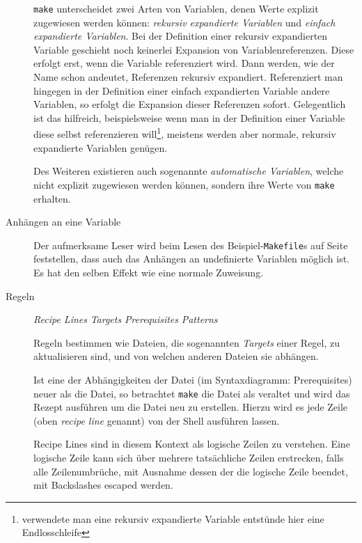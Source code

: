 \begin{description}
		\texttt{make} unterscheidet zwei Arten von Variablen, denen Werte
		explizit zugewiesen werden können: \emph{rekursiv expandierte Variablen}
		und \emph{einfach expandierte Variablen}.
		Bei der Definition einer rekursiv expandierten Variable geschieht noch
		keinerlei Expansion von Variablenreferenzen. Diese erfolgt erst, wenn
		die Variable referenziert wird. Dann werden, wie der Name schon
		andeutet, Referenzen rekursiv expandiert.
		Referenziert man hingegen in der Definition einer einfach expandierten
		Variable andere Variablen, so erfolgt die Expansion dieser Referenzen
		sofort. Gelegentlich ist das hilfreich, beispielsweise wenn man in der
		Definition einer Variable diese selbst referenzieren
		will\footnote{verwendete man eine rekursiv expandierte Variable
		entstünde hier eine Endlosschleife}, meistens werden aber normale,
		rekursiv expandierte Variablen genügen.
		
		Des Weiteren existieren auch sogenannte \emph{automatische Variablen},
		welche nicht explizit zugewiesen werden können, sondern ihre Werte von
		\texttt{make} erhalten.
	\item[Anhängen an eine Variable] \hspace{\fill}
	
		
		Der aufmerksame Leser wird beim Lesen des Beispiel-\texttt{Makefile}s
		auf Seite~\pageref{subsubsection:examplemakefile} feststellen, dass
		auch das Anhängen an undefinierte Variablen möglich ist. Es hat den
		selben Effekt wie eine normale Zuweisung.

	\item[Regeln] \hspace{\fill}
		
		\textit{Recipe Lines} 
		\textit{Targets} 
		\textit{Prerequisites} 
		\textit{Patterns} 

		Regeln bestimmen wie Dateien, die sogenannten \emph{Targets} einer
		Regel, zu aktualisieren sind, und von welchen anderen Dateien sie abhängen.
		
		Ist eine der Abhängigkeiten der Datei (im Syntaxdiagramm: Prerequisites)
		neuer als die Datei, so betrachtet \texttt{make} die Datei als veraltet
		und wird das Rezept ausführen um die Datei neu zu erstellen. Hierzu wird
		es jede Zeile (oben \textit{recipe line} genannt) von der Shell
		ausführen lassen.

		Recipe Lines sind in diesem Kontext als logische Zeilen zu verstehen.
		Eine logische Zeile kann sich über mehrere tatsächliche Zeilen
		erstrecken, falls alle Zeilenumbrüche, mit Ausnahme dessen der die
		logische Zeile beendet, mit Backslashes escaped werden.
	
\end{description}

